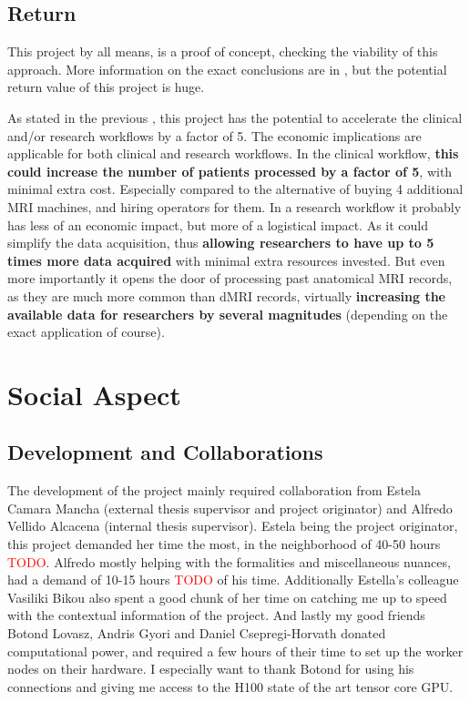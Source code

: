 \subsection{Return}

This project by all means, is a proof of concept, checking the viability of this approach. More information on the exact conclusions are in , but the potential return value of this project is huge.\par
As stated in the previous , this project has the potential to accelerate the clinical and/or research workflows by a factor of 5. The economic implications are applicable for both clinical and research workflows. In the clinical workflow, \textbf{this could increase the number of patients processed by a factor of 5}, with minimal extra cost. Especially compared to the alternative of buying 4 additional MRI machines, and hiring operators for them. In a research workflow it probably has less of an economic impact, but more of a logistical impact. As it could simplify the data acquisition, thus \textbf{allowing researchers to have up to 5 times more data acquired} with minimal extra resources invested. But even more importantly it opens the door of processing past anatomical MRI records, as they are much more common than dMRI records, virtually \textbf{increasing the available data for researchers by several magnitudes} (depending on the exact application of course).

\section{Social Aspect}

\subsection{Development and Collaborations}

The development of the project mainly required collaboration from Estela Camara Mancha (external thesis supervisor and project originator) and Alfredo Vellido Alcacena (internal thesis supervisor). Estela being the project originator, this project demanded her time the most, in the neighborhood of 40-50 hours \textcolor{red}{TODO}. Alfredo mostly helping with the formalities and miscellaneous nuances, had a demand of 10-15 hours \textcolor{red}{TODO} of his time. Additionally Estella's colleague Vasiliki Bikou also spent a good chunk of her time on catching me up to speed with the contextual information of the project. And lastly my good friends Botond Lovasz, Andris Gyori and Daniel Csepregi-Horvath donated computational power, and required a few hours of their time to set up the worker nodes on their hardware. I especially want to thank Botond for using his connections and giving me access to the H100 state of the art tensor core GPU.

